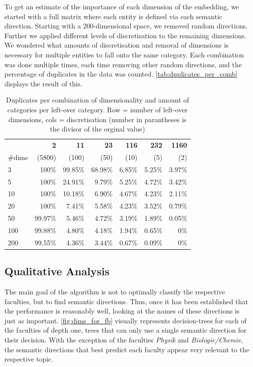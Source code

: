 To get an estimate of the importance of each dimension of the embedding, we started with a full matrix where each entity is defined via each semantic direction. Starting with a 200-dimensional space, we removed random directions. Further we applied different levels of discretisation to the remaining dimensions. We wondered what amounts of discretisation and removal of dimensions is necessary for multiple entities to fall onto the same category. Each combination was done multiple times, each time removing other random directions, and the percentage of duplicates in the data was counted. \autoref{tab:duplicates_per_comb} displays the result of this.

\begin{table}[h]
	\caption[Duplicates per combination of dimensionality and discretisation-categories.]{Duplicates per combination of dimensionality and amount of categories per left-over category. Row = number of left-over dimensions, cols = discretisation (number in parantheses is the divisor of the orginal value)}
	\begin{tabular}{lrrrrrr}
	\toprule
	 & \textbf{2} & \textbf{11} & \textbf{23} & \textbf{116} & \textbf{232} & \textbf{1160} \\
	\#dims & (5800) & (100) & (50) & (10) & (5) & (2) \\
	\midrule
	3 & 100\% & 99.85\% & 68.98\% & 6.85\% & 5.25\% & 3.97\% \\
	5 & 100\% & 24.91\% & 9.79\% & 5.25\% & 4.72\% & 3.42\% \\
	10 & 100\% & 10.18\% & 6.90\% & 4.67\% & 4.23\% & 2.11\% \\
	20 & 100\% & 7.41\% & 5.58\% & 4.23\% & 3.52\% & 0.79\% \\
	50 & 99.97\% & 5.46\% & 4.72\% & 3.19\% & 1.89\% & 0.05\% \\
	100 & 99.88\% & 4.80\% & 4.18\% & 1.94\% & 0.65\% & 0\% \\
	200 & 99.55\% & 4.36\% & 3.44\% & 0.67\% & 0.09\% & 0\% \\
	\bottomrule
	\end{tabular}
	\label{tab:duplicates_per_comb}
\end{table}


\subsection{Qualitative Analysis}

The main goal of the algorithm is not to optimally classify the respective faculties, but to find semantic directions. Thus, once it has been established that the performance is reasonably well, looking at the names of these directions is just as important. \autoref{fig:dims_for_fb} visually represents decision-trees for each of the faculties of depth one, \ie trees that can only use a single semantic direction for their decision. With the exception of the faculties \emph{Physik} and \emph{Biologie/Chemie}, the semantic directions that best predict each faculty appear very relevant to the respective topic.

